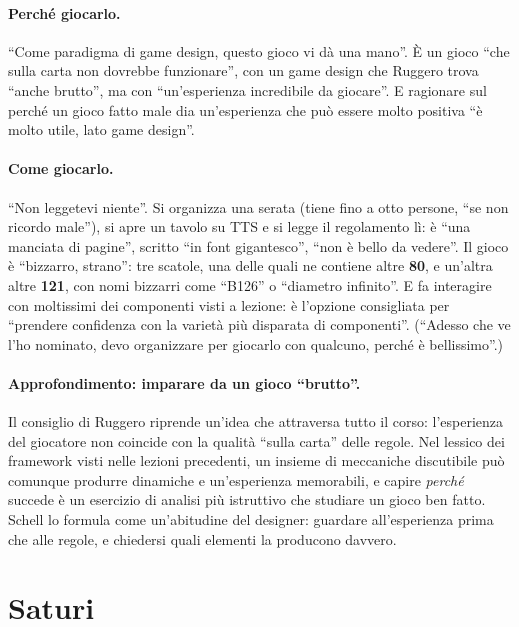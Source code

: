 \paragraph{Perché giocarlo.} ``Come paradigma di game design, questo gioco vi dà una
mano''. È un gioco ``che sulla carta non dovrebbe funzionare'', con un game design che
Ruggero trova ``anche brutto'', ma con ``un'esperienza incredibile da giocare''. E
ragionare sul perché un gioco fatto male dia un'esperienza che può essere molto
positiva ``è molto utile, lato game design''.

\paragraph{Come giocarlo.} ``Non leggetevi niente''. Si organizza una serata (tiene
fino a otto persone, ``se non ricordo male''), si apre un tavolo su TTS e si legge il
regolamento lì: è ``una manciata di pagine'', scritto ``in font gigantesco'', ``non è
bello da vedere''. Il gioco è ``bizzarro, strano'': tre scatole, una delle quali ne
contiene altre \textbf{80}, e un'altra altre \textbf{121}, con nomi bizzarri come
``B126'' o ``diametro infinito''. E fa interagire con moltissimi dei componenti visti a
lezione: è l'opzione consigliata per ``prendere confidenza con la varietà più disparata
di componenti''. (``Adesso che ve l'ho nominato, devo organizzare per giocarlo con
qualcuno, perché è bellissimo''.)

\paragraph{Approfondimento: imparare da un gioco ``brutto''.} Il consiglio di Ruggero
riprende un'idea che attraversa tutto il corso: l'esperienza del giocatore non coincide
con la qualità ``sulla carta'' delle regole. Nel lessico dei framework visti nelle
lezioni precedenti, un insieme di meccaniche discutibile può comunque produrre
dinamiche e un'esperienza memorabili, e capire \emph{perché} succede è un esercizio di
analisi più istruttivo che studiare un gioco ben fatto. Schell lo formula come
un'abitudine del designer: guardare all'esperienza prima che alle regole, e chiedersi
quali elementi la producono davvero.

\section{Saturi}
\label{a8:sec:saturi}

